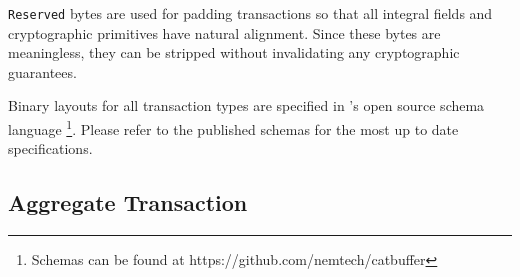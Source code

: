 \texttt{Reserved} bytes are used for padding transactions so that all integral fields and cryptographic primitives have natural alignment.
Since these bytes are meaningless, they can be stripped without invalidating any cryptographic guarantees.

Binary layouts for all transaction types are specified in \codename's open source schema language
\footnote{Schemas can be found at https://github.com/nemtech/catbuffer}.
Please refer to the published schemas for the most up to date specifications.

\begin{figure}[H]
\end{figure}

\subsection{Aggregate Transaction}
\label{sec:transactions:aggregate}

